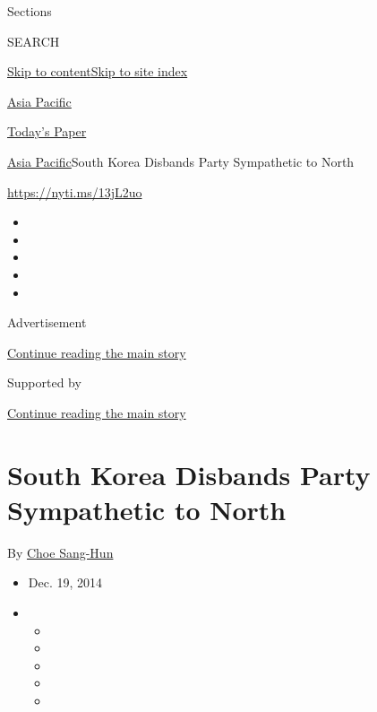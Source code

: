 Sections

SEARCH

\protect\hyperlink{site-content}{Skip to
content}\protect\hyperlink{site-index}{Skip to site index}

\href{https://www.nytimes3xbfgragh.onion/section/world/asia}{Asia
Pacific}

\href{https://myaccount.nytimes3xbfgragh.onion/auth/login?response_type=cookie\&client_id=vi}{}

\href{https://www.nytimes3xbfgragh.onion/section/todayspaper}{Today's
Paper}

\href{/section/world/asia}{Asia Pacific}\textbar{}South Korea Disbands
Party Sympathetic to North

\url{https://nyti.ms/13jL2uo}

\begin{itemize}
\item
\item
\item
\item
\item
\end{itemize}

Advertisement

\protect\hyperlink{after-top}{Continue reading the main story}

Supported by

\protect\hyperlink{after-sponsor}{Continue reading the main story}

\hypertarget{south-korea-disbands-party-sympathetic-to-north}{%
\section{South Korea Disbands Party Sympathetic to
North}\label{south-korea-disbands-party-sympathetic-to-north}}

By \href{http://www.nytimes3xbfgragh.onion/by/choe-sang-hun}{Choe
Sang-Hun}

\begin{itemize}
\item
  Dec. 19, 2014
\item
  \begin{itemize}
  \item
  \item
  \item
  \item
  \item
  \end{itemize}
\end{itemize}

